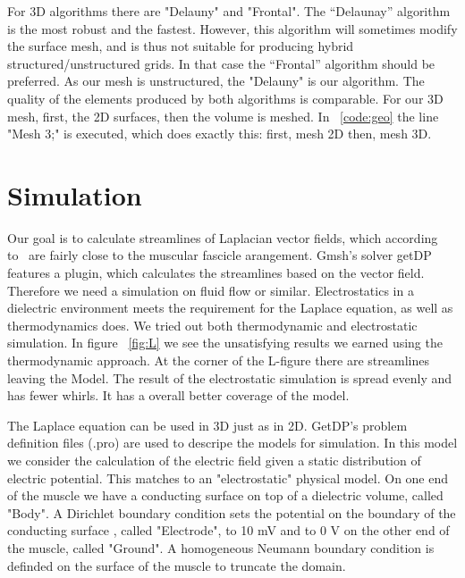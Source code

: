 \documentclass[preprint,journal]{vgtc}       %
\begin{document}
For 3D algorithms there are "Delauny" and "Frontal". 
The “Delaunay” algorithm is the most robust and the fastest. 
However, this algorithm will sometimes modify the surface mesh, and is thus not suitable for producing hybrid structured/unstructured grids.
In that case the “Frontal” algorithm should be preferred. 
As our mesh is unstructured, the "Delauny" is our algorithm. 
The quality of the elements produced by both algorithms is comparable.
For our 3D mesh, first, the 2D surfaces, then the volume is meshed. 
In ~\ref{code:geo} the line "Mesh 3;" is executed, which does exactly this: first, mesh 2D then, mesh 3D.
%	

\section{Simulation}
Our goal is to calculate streamlines of Laplacian vector fields, which according to~\cite{Choi2013} are fairly close to the muscular fascicle arangement. %
Gmsh's solver getDP features a plugin, which calculates the streamlines based on the vector field. 
Therefore we need a simulation on fluid flow or similar. %
Electrostatics in a dielectric environment meets the requirement for the Laplace equation, as well as thermodynamics does.
We tried out both thermodynamic and electrostatic simulation. 
In figure ~\ref{fig:L} we see the unsatisfying results we earned using the thermodynamic approach. 
At the corner of the L-figure there are streamlines leaving the Model. 
The result of the electrostatic simulation is spread evenly and has fewer whirls. 
It has a overall better coverage of the model.

The Laplace equation can be used in 3D just as in 2D. 
GetDP's problem definition files (.pro) are used to descripe the models for simulation. 
In this model we consider the calculation of the electric field given a static distribution of electric potential. 
This matches to an "electrostatic" physical model. 
On one end of the muscle we have a conducting surface on top of a dielectric volume, called "Body".
A Dirichlet boundary condition sets the potential on the boundary of the conducting surface , called "Electrode", to 10 mV and to 0 V on the other end of the muscle, called "Ground".
A homogeneous Neumann boundary condition is definded on the surface of the muscle to truncate the domain.
\end{document}
